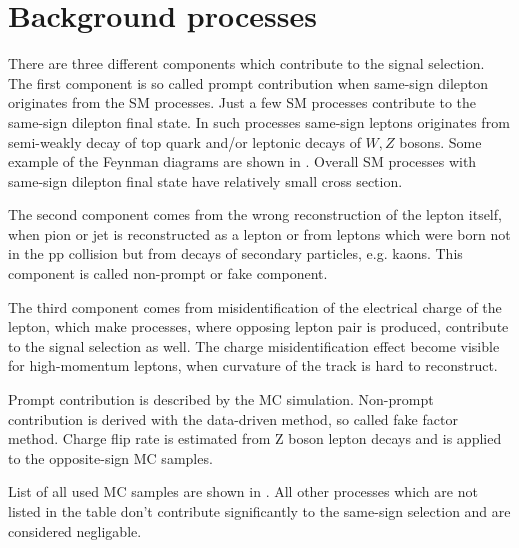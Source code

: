 \section{Background processes}
\label{sec:wprimeBackgrounds}


There are three different components which contribute to the signal selection.
The first component is so called prompt contribution when same-sign dilepton originates from the SM processes.
Just a few SM processes contribute to the same-sign dilepton final state. In such processes same-sign leptons originates from semi-weakly decay of top quark
and/or leptonic decays of $W, Z$ bosons. Some example of the Feynman diagrams are shown in .
Overall SM processes with same-sign dilepton final state have relatively small cross section.

The second component comes from the wrong reconstruction of the lepton itself, when pion or jet is reconstructed as a lepton or from leptons which were born 
not in the pp collision but from decays of secondary particles, e.g. kaons. This component is called non-prompt or fake component.

The third component comes from misidentification of the electrical charge of the lepton, which make processes, where opposing lepton pair is produced, 
contribute to the signal selection as well. The charge misidentification effect become visible for high-momentum leptons, when curvature of the track 
is hard to reconstruct.

Prompt contribution is described by the MC simulation. 
Non-prompt contribution is derived with the data-driven method, so called fake factor method.
Charge flip rate is estimated from Z boson lepton decays and is applied to the opposite-sign MC samples.

List of all used MC samples are shown in . All other processes which are not listed in the table don't contribute
significantly to the same-sign selection and are considered negligable.

